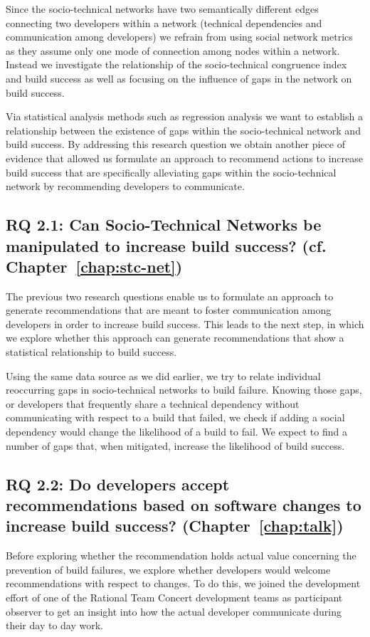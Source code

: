 Since the socio-technical networks have two semantically different edges connecting two developers within a network (technical dependencies and communication among developers) we refrain from using social network metrics as they assume only one mode of connection among nodes within a network.
Instead we investigate the relationship of the socio-technical congruence index and build success as well as focusing on the influence of gaps in the network on build success.

Via statistical analysis methods such as regression analysis we want to establish a relationship between the existence of gaps within the socio-technical network and build success.
By addressing this research question we obtain another piece of evidence that allowed us formulate an approach to recommend actions to increase build success that are specifically alleviating gaps within the socio-technical network by recommending developers to communicate.

\subsection{%
RQ 2.1: Can Socio-Technical Networks be manipulated to increase build success? (cf. Chapter~\ref{chap:stc-net})}
The previous two research questions enable us to formulate an approach to generate recommendations that are meant to foster communication among developers in order to increase build success.
This leads to the next step, in which we explore whether this approach can generate recommendations that show a statistical relationship to build success.

Using the same data source as we did earlier, we try to relate individual reoccurring gaps in socio-technical networks to build failure.
Knowing those gaps, or developers that frequently share a technical dependency without communicating with respect to a build that failed, we check if adding a social dependency would change the likelihood of a build to fail.
We expect to find a number of gaps that, when mitigated, increase the likelihood of build success.

\subsection{%
  RQ 2.2: Do developers accept recommendations based on software changes to increase build success? (Chapter~\ref{chap:talk})}
Before exploring whether the recommendation holds actual value concerning the prevention of build failures, we explore whether developers would welcome recommendations with respect to changes.
To do this, we joined the development effort of one of the Rational Team Concert development teams as participant observer to get an insight into how the actual developer communicate during their day to day work.

